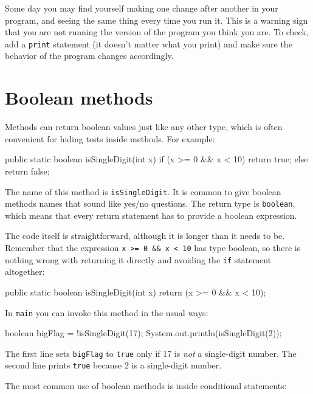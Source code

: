 \documentclass[12pt]{book}
\begin{document}
Some day you may find yourself making one change after another in your program, and seeing the same thing every time you run it.
This is a warning sign that you are not running the version of the program you think you are.
To check, add a {\tt print} statement (it doesn't matter what you print) and make sure the behavior of the program changes accordingly.


\section{Boolean methods}
\label{boolean}


Methods can return boolean values just like any other type, which is often convenient for hiding tests inside methods.
For example:

\begin{code}
    public static boolean isSingleDigit(int x) {
        if (x >= 0 && x < 10) {
            return true;
        } else {
            return false;
        }
    }
\end{code}

The name of this method is {\tt isSingleDigit}.
It is common to give boolean methods names that sound like yes/no questions.
The return type is {\tt boolean}, which means that every return statement has to provide a boolean expression.

The code itself is straightforward, although it is longer than it needs to be.
Remember that the expression {\tt x >= 0 \&\& x < 10} has type boolean, so there is nothing wrong with returning it directly and avoiding the {\tt if} statement altogether:

\begin{code}
    public static boolean isSingleDigit(int x) {
        return (x >= 0 && x < 10);
    }
\end{code}

In {\tt main} you can invoke this method in the usual ways:

\begin{code}
    boolean bigFlag = !isSingleDigit(17);
    System.out.println(isSingleDigit(2));
\end{code}

The first line sets {\tt bigFlag} to {\tt true} only if 17 is {\em not} a single-digit number.
The second line prints {\tt true} because 2 is a single-digit number.

The most common use of boolean methods is inside conditional statements:
\end{document}
